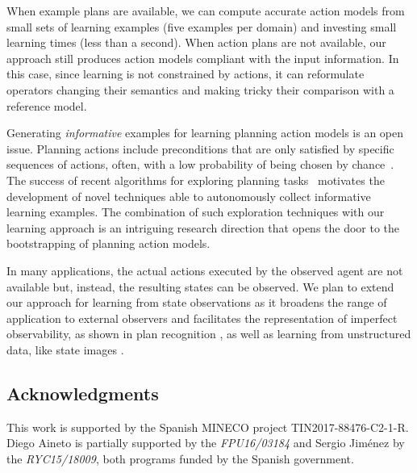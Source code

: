 \documentclass[letterpaper]{article} %
\newcommand{\strips}{\textsc{Strips}}     %
\begin{document}
When example plans are available, we can compute accurate action models from small sets of learning examples (five examples per domain) and investing small learning times (less than a second). When action plans are not available, our approach still produces action models compliant with the input information. In this case, since learning is not constrained by actions, it can reformulate operators changing their semantics and making tricky their comparison with a reference model. %


Generating {\em informative} examples for learning planning action models is an open issue. Planning actions include preconditions that are only satisfied by specific sequences of actions, often, with a low probability of being chosen by chance~\cite{fern2004learning}. The success of recent algorithms for exploring planning tasks~\cite{FrancesRLG17} motivates the development of novel techniques able to autonomously collect informative learning examples. The combination of such exploration techniques with our learning approach is an intriguing research direction that opens the door to the bootstrapping of planning action models.

In many applications, the actual actions executed by the observed agent are not available but, instead, the resulting states can be observed. We plan to extend our approach for learning from state observations as it broadens the range of application to external observers and facilitates the representation of imperfect observability, as shown in plan recognition \cite{SohrabiRU16}, as well as learning from unstructured data, like state images \cite{AsaiF18}.


\begin{small}
\subsection*{Acknowledgments}
This work is supported by the Spanish MINECO project TIN2017-88476-C2-1-R. Diego Aineto is partially supported by the {\it FPU16/03184} and Sergio Jim\'enez by the {\it RYC15/18009}, both programs funded by the Spanish government.
\end{small}



\end{document}
